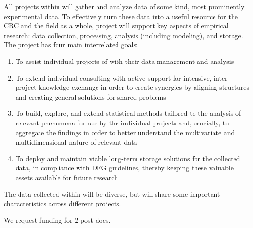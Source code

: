 
\notocsubsection{\pipl}

\begin{giprenv}
  
\end{giprenv}
\gicolsep
\begin{giprenv}
  
\end{giprenv}
\girowsep
\begin{giprenv}
  
\end{giprenv}

\notocsubsection{\prsum}

All projects within \thiscrc{} will gather and analyze data of some
kind, most prominently experimental data. To effectively
turn these data into a useful resource for the CRC and the field as a
whole, project  will support key aspects of empirical
research: data collection, processing, analysis (including modeling),
and storage. The project has four main interrelated goals:

\begin{enumerate}
\item To assist individual projects of \thiscrc{} with their data
  management and analysis  
\item To extend individual consulting with active support for
  intensive, inter-project knowledge exchange in order to create
  synergies by aligning structures and creating general solutions for
  shared problems
\item To build, explore, and extend statistical methods tailored to
  the analysis of relevant phenomena for use by the individual
  projects and, crucially, to aggregate the findings in order to
  better understand the multivariate and multidimensional nature of
  relevant data
\item To deploy and maintain viable long-term storage solutions for
  the collected data, in compliance with DFG guidelines, thereby
  keeping these valuable assets available for future research
\end{enumerate}

The data collected within \thiscrc{} will be diverse, but will share
some important characteristics across different projects.


\notocsubsection{\funds}

We request funding for 2 post-docs.